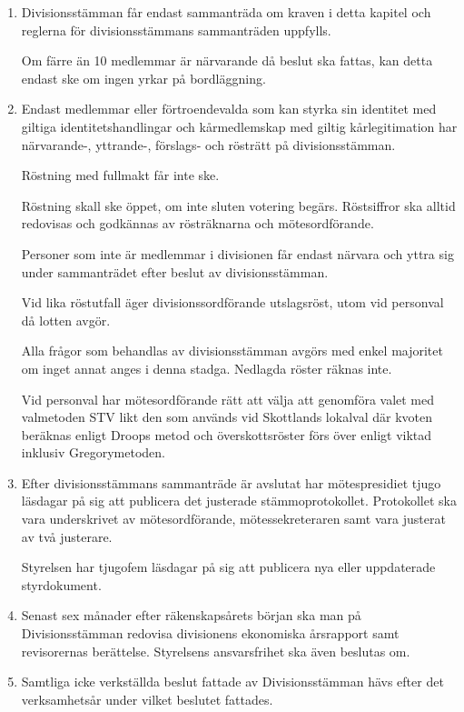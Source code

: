 \documentclass{dvd}
\begin{document}
\begin{enumerate}[label=\arabic* §, ref=\arabic*]
		\item Divisionsstämman får endast sammanträda om kraven i detta kapitel och reglerna för divisionsstämmans sammanträden uppfylls.

		Om färre än 10 medlemmar är närvarande då beslut ska fattas, kan detta endast ske om ingen yrkar på bordläggning.

		\item Endast medlemmar eller förtroendevalda som kan styrka sin identitet med giltiga identitetshandlingar och kårmedlemskap med giltig kårlegitimation har närvarande-, yttrande-, förslags- och rösträtt på divisionsstämman.

		Röstning med fullmakt får inte ske.

		Röstning skall ske öppet, om inte sluten votering begärs.
		Röstsiffror ska alltid redovisas och godkännas av rösträknarna och mötesordförande.

		Personer som inte är medlemmar i divisionen får endast närvara och yttra sig under sammanträdet efter beslut av divisionsstämman.

		Vid lika röstutfall äger divisionssordförande utslagsröst, utom vid personval då lotten avgör.

		Alla frågor som behandlas av divisionsstämman avgörs med enkel majoritet om inget annat anges i denna stadga.
		Nedlagda röster räknas inte.

		Vid personval har mötesordförande rätt att välja att genomföra valet med valmetoden STV likt den som används vid Skottlands lokalval där kvoten beräknas enligt Droops metod och överskottsröster förs över enligt viktad inklusiv Gregorymetoden.

		\item Efter divisionsstämmans sammanträde är avslutat har mötespresidiet tjugo läsdagar på sig att publicera det justerade stämmoprotokollet.
		Protokollet ska vara underskrivet av mötesordförande, mötessekreteraren samt vara justerat av två justerare.

		Styrelsen har tjugofem läsdagar på sig att publicera nya eller uppdaterade styrdokument.

		\item Senast sex månader efter räkenskapsårets början ska man på Divisionsstämman redovisa divisionens ekonomiska årsrapport samt revisorernas berättelse.
		Styrelsens ansvarsfrihet ska även beslutas om.

                \item Samtliga icke verkställda beslut fattade av Divisionsstämman hävs efter det verksamhetsår under vilket beslutet fattades.
	\end{enumerate}
\end{document}
